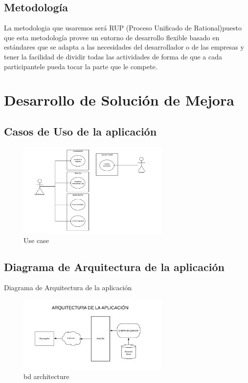 \documentclass[twoside,twocolumn]{article}
\begin{document}
\subsection{Metodología}
La metodologia que usaremos será RUP (Proceso Unificado de Rational)puesto que esta metodología provee un entorno de desarrollo flexible basado en estándares que se adapta a las necesidades del desarrollador o de las empresas y tener la facilidad de dividir todas las actividades de forma de que a cada participantele pueda tocar la parte que le compete.



\section{Desarrollo de Solución de Mejora}

\subsection{Casos de Uso de la aplicación}
\begin{figure}[h!]
	\begin{center}
		\includegraphics[width=7.5cm]{./Imagenes/use_case} 
		\caption{Use case}
	\end{center}
\end{figure}

\subsection{Diagrama de Arquitectura de la aplicación}
Diagrama de Arquitectura de la aplicación
\begin{figure}[h!]
	\begin{center}
		\includegraphics[width=7.5cm]{./Imagenes/bd_architecture} 
		\caption{bd architecture}
	\end{center}
\end{figure}
\end{document}
